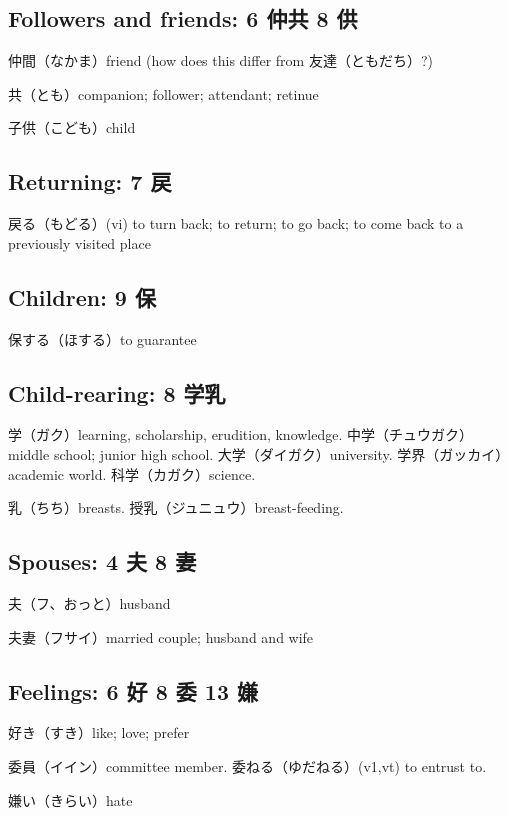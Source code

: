 \subsection{Followers and friends: 6 仲共 8 供}

仲間（なかま）friend (how does this differ from 友達（ともだち）?)

共（とも）companion; follower; attendant; retinue

子供（こども）child

\subsection{Returning: 7 戻}

戻る（もどる）(vi) to turn back; to return; to go back;
to come back to a previously visited place

\subsection{Children: 9 保}

保する（ほする）to guarantee

\subsection{Child-rearing: 8 学乳}

学（ガク）learning, scholarship, erudition, knowledge.
中学（チュウガク）middle school; junior high school.
大学（ダイガク）university.
学界（ガッカイ）academic world.
科学（カガク）science.

乳（ちち）breasts.
授乳（ジュニュウ）breast-feeding.

\subsection{Spouses: 4 夫 8 妻}

夫（フ、おっと）husband

夫妻（フサイ）married couple; husband and wife

\subsection{Feelings: 6 好 8 委 13 嫌}

好き（すき）like; love; prefer

委員（イイン）committee member.
委ねる（ゆだねる）(v1,vt) to entrust to.

嫌い（きらい）hate

